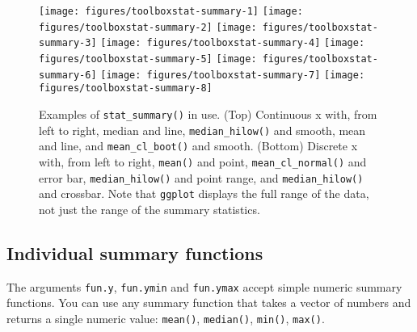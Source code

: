 \begin{figure}
\texttt{[image: figures/toolboxstat-summary-1]} \texttt{[image: figures/toolboxstat-summary-2]} \texttt{[image: figures/toolboxstat-summary-3]} \texttt{[image: figures/toolboxstat-summary-4]} \texttt{[image: figures/toolboxstat-summary-5]} \texttt{[image: figures/toolboxstat-summary-6]} \texttt{[image: figures/toolboxstat-summary-7]} \texttt{[image: figures/toolboxstat-summary-8]} \caption{Examples of \texttt{stat\_summary()} in use. (Top) Continuous x with, from left to right, median and line, \texttt{median\_hilow()} and smooth, mean and line, and \texttt{mean\_cl\_boot()} and smooth. (Bottom) Discrete x with, from left to right, \texttt{mean()} and point, \texttt{mean\_cl\_normal()} and error bar, \texttt{median\_hilow()} and point range, and \texttt{median\_hilow()} and crossbar. Note that \texttt{ggplot} displays the full range of the data, not just the range of the summary statistics.\label{fig:stat-summary}}
\end{figure}

\subsection{Individual summary functions}

The arguments \texttt{fun.y}, \texttt{fun.ymin} and \texttt{fun.ymax}
accept simple numeric summary functions. You can use any summary
function that takes a vector of numbers and returns a single numeric
value: \texttt{mean()}, \texttt{median()}, \texttt{min()},
\texttt{max()}.

\begin{Shaded}
\begin{Highlighting}[]
\NormalTok{>}\StringTok{ }\StringTok{ } \NormalTok{)}
\NormalTok{>}\StringTok{ }\StringTok{ }
\NormalTok{+}\StringTok{   }\NormalTok{(}\NormalTok{(} \NormalTok{), } 
\NormalTok{+}\StringTok{     } \NormalTok{) +}
\NormalTok{+}\StringTok{   }\NormalTok{(}\NormalTok{(} \NormalTok{), } 
\NormalTok{+}\StringTok{     } \NormalTok{) +}\StringTok{ }
\NormalTok{+}\StringTok{   }\NormalTok{(}\NormalTok{)}
\end{Highlighting}
\end{Shaded}

